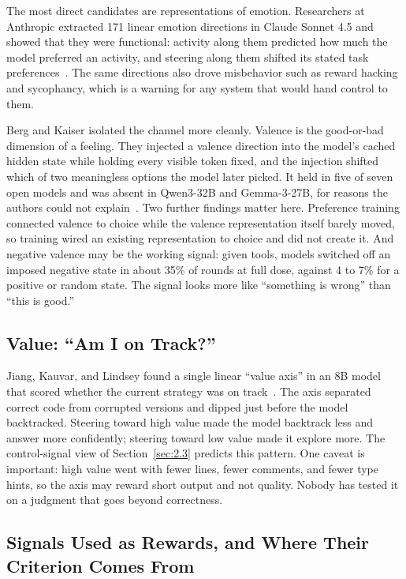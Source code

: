 \documentclass[journal]{IEEEtran}
\begin{document}
The most direct candidates are representations of emotion. Researchers at Anthropic extracted 171 linear emotion directions in Claude Sonnet 4.5 and showed that they were functional: activity along them predicted how much the model preferred an activity, and steering along them shifted its stated task preferences~\cite{Sofroniew2026}. The same directions also drove misbehavior such as reward hacking and sycophancy, which is a warning for any system that would hand control to them.

Berg and Kaiser isolated the channel more cleanly. Valence is the good-or-bad dimension of a feeling. They injected a valence direction into the model's cached hidden state while holding every visible token fixed, and the injection shifted which of two meaningless options the model later picked. It held in five of seven open models and was absent in Qwen3-32B and Gemma-3-27B, for reasons the authors could not explain~\cite{Berg2026}. Two further findings matter here. Preference training connected valence to choice while the valence representation itself barely moved, so training wired an existing representation to choice and did not create it. And negative valence may be the working signal: given tools, models switched off an imposed negative state in about 35\% of rounds at full dose, against 4 to 7\% for a positive or random state. The signal looks more like ``something is wrong'' than ``this is good.''

\subsection{Value: ``Am I on Track?''}\label{sec:5.2}

Jiang, Kauvar, and Lindsey found a single linear ``value axis'' in an 8B model that scored whether the current strategy was on track~\cite{Jiang2026}. The axis separated correct code from corrupted versions and dipped just before the model backtracked. Steering toward high value made the model backtrack less and answer more confidently; steering toward low value made it explore more. The control-signal view of Section~\ref{sec:2.3} predicts this pattern. One caveat is important: high value went with fewer lines, fewer comments, and fewer type hints, so the axis may reward short output and not quality. Nobody has tested it on a judgment that goes beyond correctness.

\subsection{Signals Used as Rewards, and Where Their Criterion Comes From}\label{sec:5.3}
\end{document}
